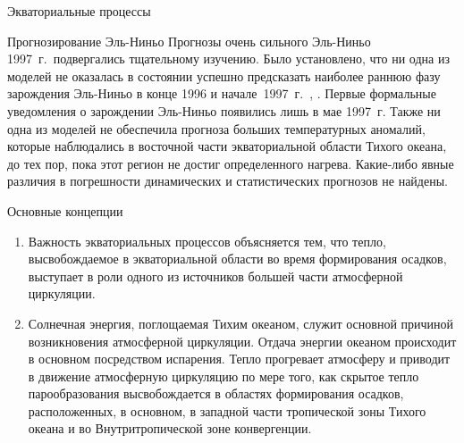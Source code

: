 \begin{chapter}{Экваториальные процессы}
\begin{section}{Прогнозирование Эль-Ниньо}
Прогнозы очень сильного Эль-Ниньо 1997~г.\ подвергались тщательному изучению.
Было установлено, что ни одна из моделей не оказалась в состоянии успешно
предсказать наиболее раннюю фазу зарождения Эль-Ниньо в конце 1996 и 
начале~1997~г.~\cite{Oldenborgh:2005}, \cite{Barnston:1999}.
Первые формальные уведомления о зарождении Эль-Ниньо появились лишь 
в мае 1997~г. Также ни одна из моделей не обеспечила прогноза больших
температурных аномалий, которые наблюдались в восточной части экваториальной
области Тихого океана, до тех пор, пока этот регион не достиг определенного
нагрева. Какие-либо явные различия в погрешности динамических и 
статистических прогнозов не найдены.
%
\end{section}

\begin{section}{Основные концепции}
\begin{enumerate}
\item
Важность экваториальных процессов объясняется тем, что тепло, высвобождаемое
в экваториальной области во время формирования осадков, выступает в роли
одного из источников большей части атмосферной циркуляции.
%

\item
Солнечная энергия, поглощаемая Тихим океаном, служит основной причиной
возникновения атмосферной циркуляции. Отдача энергии океаном
происходит в основном посредством испарения. Тепло прогревает атмосферу 
и приводит в движение атмосферную циркуляцию по мере того, как скрытое тепло 
парообразования высвобождается в областях формирования осадков, расположенных,
в основном, в западной части тропической зоны Тихого океана и во 
Внутритропической зоне конвергенции.
%


\end{enumerate}
\end{section}
\end{chapter}
